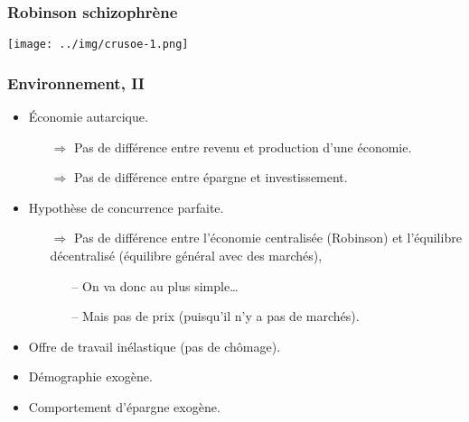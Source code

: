 \documentclass[10pt,notheorems]{beamer}
\theoremstyle{plain}
\theoremstyle{definition} %
\begin{document}
\begin{frame}
  \frametitle{Robinson schizophrène}

  \begin{center}
    \texttt{[image: ../img/crusoe-1.png]}
  \end{center}

\end{frame}


\begin{frame}
  \frametitle{Environnement, II}

  \begin{itemize}

  \item Économie autarcique.

    \begin{itemize}
    \item[$\Rightarrow$] Pas de différence entre revenu et production d'une économie.
    \item[$\Rightarrow$] Pas de différence entre épargne et investissement.
    \end{itemize}

    \bigskip

  \item Hypothèse de concurrence parfaite.\newline

    \begin{itemize}

    \item[$\Rightarrow$] Pas de différence entre l'économie
      centralisée (Robinson) et l'équilibre décentralisé (équilibre
      général avec des marchés),\newline

      \begin{itemize}
      \item[--] On va donc au plus simple\ldots
      \item[--] Mais pas de prix (puisqu'il n'y a pas de marchés).
      \end{itemize}

    \end{itemize}

    \bigskip

  \item Offre de travail inélastique (pas de chômage).\newline

  \item Démographie exogène.\newline

  \item Comportement d'épargne exogène.

  \end{itemize}

\end{frame}
\end{document}
